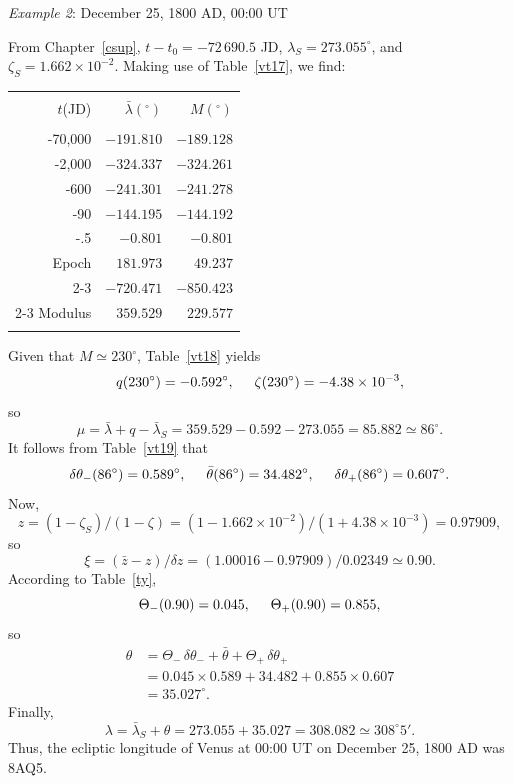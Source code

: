 \begin{center}
 {\em Example 2}: December 25,  1800 AD, 00:00 UT
\end{center}
From Chapter~\ref{csup}, $t-t_0=-72\,690.5$ JD, $\lambda_S= 273.055^\circ$, and $\zeta_S= 1.662\times 10^{-2}$. Making use of
Table~\ref{vt17}, we find:
\begin{center}
\begin{tabular}{rrr}
&&\\
$t$(JD) & $\bar{\lambda}(^\circ)$ & $ M(^\circ)$\\[-2ex]
&&\\
-70,000 & $-191.810$ & $-189.128$\\
-2,000 & $-324.337$ & $-324.261$\\
-600 & $-241.301$ & $-241.278$\\
-90 & $-144.195$ & $-144.192$\\
-.5 & $-0.801$ & $-0.801$\\
Epoch & $181.973$ & $49.237$\\\cline{2-3}
&$-720.471$ & $-850.423$\\\cline{2-3}
Modulus & $359.529$ & $229.577$\\
&&\\
\end{tabular}
\end{center}
Given that $M\simeq 230^\circ$, Table~\ref{vt18} yields 
$$
q(230^\circ)= -0.592^\circ,\mbox{\hspace{0.5cm}}\zeta(230^\circ)=-4.38\times 10^{-3},
$$
so
$$
\mu=\bar{\lambda}+q-\bar{\lambda}_S =359.529-0.592-273.055= 85.882\simeq 86^\circ.
$$
It follows from Table~\ref{vt19}
that 
$$
\delta\theta_-(86^\circ) = 0.589^\circ, \mbox{\hspace{0.5cm}}\bar{\theta}(86^\circ)=34.482^\circ, \mbox{\hspace{0.5cm}}\delta\theta_+(86^\circ) = 0.607^\circ.
$$
 Now, 
 $$
 z= (1-\zeta_S)/(1-\zeta) = (1-1.662\times 10^{-2})/(1+4.38\times 10^{-3}) =
0.97909,
$$
so
$$
\xi = (\bar{z}-z)/\delta z = (1.00016-0.97909)/0.02349 \simeq 0.90.
$$
According to Table~\ref{ty}, 
$$
\Theta_-(0.90) = 0.045,\mbox{\hspace{0.5cm}}\Theta_+(0.90) = 0.855,
$$
so
\begin{align*}
\theta  &= \Theta_-\,\delta\theta_- + \bar{\theta}+\Theta_+\,\delta\theta_+\\[0.5ex]
& = 0.045\times 0.589+34.482+0.855\times 0.607\\[0.5ex]
& = 35.027^\circ.
\end{align*}
Finally,
$$
\lambda=\bar{\lambda}_S  + \theta= 273.055+35.027= 308.082 \simeq 308^\circ 5'.
$$
Thus,
the ecliptic longitude of Venus at 00:00 UT on December 25, 1800 AD was 8AQ5.

